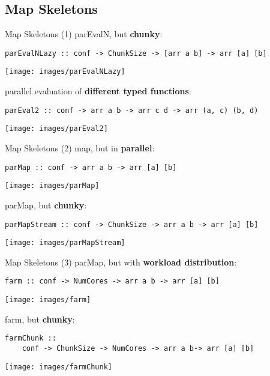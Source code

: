 \subsection{Map Skeletons}
\begin{frame}[fragile]{Map Skeletons (1)}
parEvalN, but \textbf{chunky}:
\begin{lstlisting}[frame=htrbl]
parEvalNLazy :: conf -> ChunkSize -> [arr a b] -> arr [a] [b]
\end{lstlisting}
\begin{center}
\texttt{[image: images/parEvalNLazy]}
\end{center}
parallel evaluation of \textbf{different typed functions}:
\begin{lstlisting}[frame=htrbl]
parEval2 :: conf -> arr a b -> arr c d -> arr (a, c) (b, d)
\end{lstlisting}
\begin{center}
\texttt{[image: images/parEval2]}
\end{center}
\end{frame}
\begin{frame}[fragile] {Map Skeletons (2)}
map, but in \textbf{parallel}:
\begin{lstlisting}[frame=htrbl]
parMap :: conf -> arr a b -> arr [a] [b]
\end{lstlisting}
\begin{center}
\texttt{[image: images/parMap]}
\end{center}
parMap, but \textbf{chunky}:
\begin{lstlisting}[frame=htrbl]
parMapStream :: conf -> ChunkSize -> arr a b -> arr [a] [b]
\end{lstlisting}
\begin{center}
\texttt{[image: images/parMapStream]}
\end{center}
\end{frame}
\begin{frame}[fragile]{Map Skeletons (3)}
parMap, but with \textbf{workload distribution}:
\begin{lstlisting}[frame=htrbl]
farm :: conf -> NumCores -> arr a b -> arr [a] [b]
\end{lstlisting}
\begin{center}
\texttt{[image: images/farm]}
\end{center}
farm, but \textbf{chunky}:
\begin{lstlisting}[frame=htrbl]
farmChunk ::
	conf -> ChunkSize -> NumCores -> arr a b-> arr [a] [b]
\end{lstlisting}
\begin{center}
\texttt{[image: images/farmChunk]}
\end{center}
\end{frame}